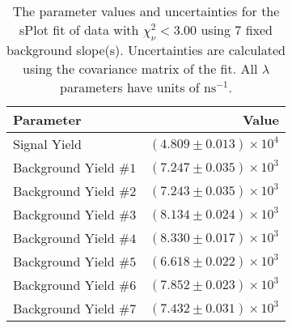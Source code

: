 
\begin{table}
    \begin{center}
        \begin{tabular}{lr}\toprule
            Parameter & Value \\\midrule
            Signal Yield & $(4.809 \pm 0.013) \times 10^{4}$ \\
            Background Yield $\#1$ & $(7.247 \pm 0.035) \times 10^{3}$ \\
            Background Yield $\#2$ & $(7.243 \pm 0.035) \times 10^{3}$ \\
            Background Yield $\#3$ & $(8.134 \pm 0.024) \times 10^{3}$ \\
            Background Yield $\#4$ & $(8.330 \pm 0.017) \times 10^{3}$ \\
            Background Yield $\#5$ & $(6.618 \pm 0.022) \times 10^{3}$ \\
            Background Yield $\#6$ & $(7.852 \pm 0.023) \times 10^{3}$ \\
            Background Yield $\#7$ & $(7.432 \pm 0.031) \times 10^{3}$ \\\bottomrule
        \end{tabular}
        \caption{The parameter values and uncertainties for the sPlot fit of data with $\chi^2_\nu < 3.00$ using 7 fixed background slope(s). Uncertainties are calculated using the covariance matrix of the fit. All $\lambda$ parameters have units of $\si{\nano\second}^{-1}$.}
    \end{center}
\end{table}

